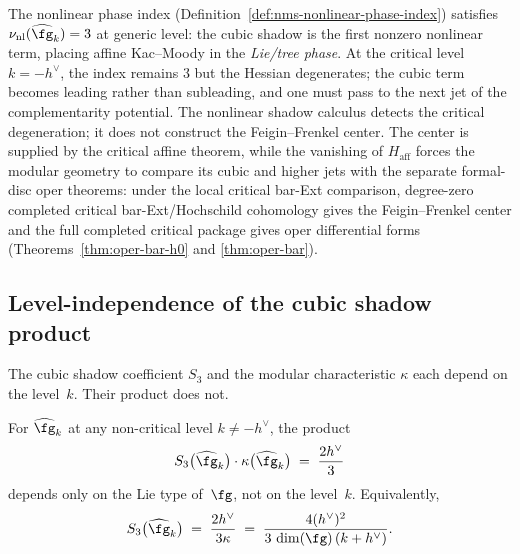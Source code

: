 \begin{remark}%
\label{rem:affine-phase-index}
The nonlinear phase index
(Definition~\ref{def:nms-nonlinear-phase-index}) satisfies
$\nu_{\mathrm{nl}}(\widehat{\fg}_k) = 3$ at generic level: the
cubic shadow is the first nonzero nonlinear term, placing
affine Kac--Moody in the \emph{Lie/tree phase}. At the
critical level $k = -h^\vee$, the index remains $3$ but the
Hessian degenerates; the cubic term becomes leading rather than
subleading, and one must pass to the next jet of the
complementarity potential. The nonlinear shadow calculus detects the
critical degeneration; it does not construct the
Feigin--Frenkel center.  The center is supplied by the critical
affine theorem, while the vanishing of $H_{\mathrm{aff}}$ forces the
modular geometry to compare its cubic and higher jets with the
separate formal-disc oper theorems: under the local critical bar-Ext
comparison, degree-zero completed critical bar-Ext/Hochschild
cohomology gives the Feigin--Frenkel center and the full completed
critical package gives oper differential forms
\textup{(}Theorems~\textup{\ref{thm:oper-bar-h0} and
\ref{thm:oper-bar}}\textup{)}.
\end{remark}

\subsection{Level-independence of the cubic shadow product}
\label{subsec:affine-cubic-level-independence}

The cubic shadow coefficient $S_3$ and the modular characteristic
$\kappa$ each depend on the level~$k$. Their product does not.

\begin{proposition}\label{prop:km-cubic-shadow-level-independence}
For $\widehat{\fg}_k$ at any non-critical level $k \neq -h^\vee$,
the product
\begin{equation}\label{eq:km-cubic-level-independence}
S_3\bigl(\widehat{\fg}_k\bigr) \cdot
\kappa\bigl(\widehat{\fg}_k\bigr)
\;=\;
\frac{2h^\vee}{3}
\end{equation}
depends only on the Lie type of~$\fg$, not on the level~$k$.
Equivalently,
\begin{equation}\label{eq:km-S3-explicit}
S_3\bigl(\widehat{\fg}_k\bigr)
\;=\;
\frac{2h^\vee}{3\kappa}
\;=\;
\frac{4(h^\vee)^2}{3\,\dim(\fg)\,(k+h^\vee)}.
\end{equation}
\end{proposition}

